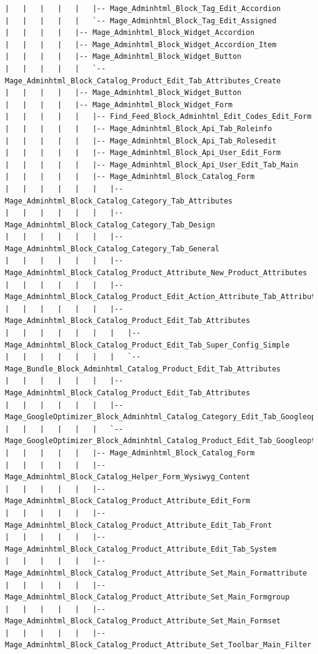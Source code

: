 \documentclass[oneside]{book}
\begin{document}
\begin{lstlisting}
|   |   |   |   |   |-- Mage_Adminhtml_Block_Tag_Edit_Accordion
|   |   |   |   |   `-- Mage_Adminhtml_Block_Tag_Edit_Assigned
|   |   |   |   |-- Mage_Adminhtml_Block_Widget_Accordion
|   |   |   |   |-- Mage_Adminhtml_Block_Widget_Accordion_Item
|   |   |   |   |-- Mage_Adminhtml_Block_Widget_Button
|   |   |   |   |   `-- Mage_Adminhtml_Block_Catalog_Product_Edit_Tab_Attributes_Create
|   |   |   |   |-- Mage_Adminhtml_Block_Widget_Button
|   |   |   |   |-- Mage_Adminhtml_Block_Widget_Form
|   |   |   |   |   |-- Find_Feed_Block_Adminhtml_Edit_Codes_Edit_Form
|   |   |   |   |   |-- Mage_Adminhtml_Block_Api_Tab_Roleinfo
|   |   |   |   |   |-- Mage_Adminhtml_Block_Api_Tab_Rolesedit
|   |   |   |   |   |-- Mage_Adminhtml_Block_Api_User_Edit_Form
|   |   |   |   |   |-- Mage_Adminhtml_Block_Api_User_Edit_Tab_Main
|   |   |   |   |   |-- Mage_Adminhtml_Block_Catalog_Form
|   |   |   |   |   |   |-- Mage_Adminhtml_Block_Catalog_Category_Tab_Attributes
|   |   |   |   |   |   |-- Mage_Adminhtml_Block_Catalog_Category_Tab_Design
|   |   |   |   |   |   |-- Mage_Adminhtml_Block_Catalog_Category_Tab_General
|   |   |   |   |   |   |-- Mage_Adminhtml_Block_Catalog_Product_Attribute_New_Product_Attributes
|   |   |   |   |   |   |-- Mage_Adminhtml_Block_Catalog_Product_Edit_Action_Attribute_Tab_Attributes
|   |   |   |   |   |   |-- Mage_Adminhtml_Block_Catalog_Product_Edit_Tab_Attributes
|   |   |   |   |   |   |   |-- Mage_Adminhtml_Block_Catalog_Product_Edit_Tab_Super_Config_Simple
|   |   |   |   |   |   |   `-- Mage_Bundle_Block_Adminhtml_Catalog_Product_Edit_Tab_Attributes
|   |   |   |   |   |   |-- Mage_Adminhtml_Block_Catalog_Product_Edit_Tab_Attributes
|   |   |   |   |   |   |-- Mage_GoogleOptimizer_Block_Adminhtml_Catalog_Category_Edit_Tab_Googleoptimizer
|   |   |   |   |   |   `-- Mage_GoogleOptimizer_Block_Adminhtml_Catalog_Product_Edit_Tab_Googleoptimizer
|   |   |   |   |   |-- Mage_Adminhtml_Block_Catalog_Form
|   |   |   |   |   |-- Mage_Adminhtml_Block_Catalog_Helper_Form_Wysiwyg_Content
|   |   |   |   |   |-- Mage_Adminhtml_Block_Catalog_Product_Attribute_Edit_Form
|   |   |   |   |   |-- Mage_Adminhtml_Block_Catalog_Product_Attribute_Edit_Tab_Front
|   |   |   |   |   |-- Mage_Adminhtml_Block_Catalog_Product_Attribute_Edit_Tab_System
|   |   |   |   |   |-- Mage_Adminhtml_Block_Catalog_Product_Attribute_Set_Main_Formattribute
|   |   |   |   |   |-- Mage_Adminhtml_Block_Catalog_Product_Attribute_Set_Main_Formgroup
|   |   |   |   |   |-- Mage_Adminhtml_Block_Catalog_Product_Attribute_Set_Main_Formset
|   |   |   |   |   |-- Mage_Adminhtml_Block_Catalog_Product_Attribute_Set_Toolbar_Main_Filter

\end{lstlisting}
\end{document}
